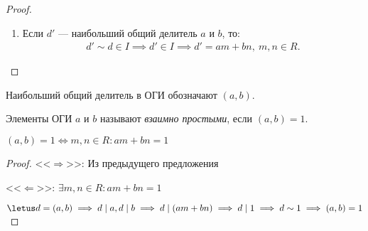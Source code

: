 \begin{proof}
\begin{enumerate}
        \item Если $d'$ --- наибольший общий делитель $a$ и $b$, то:
        \begin{gather*}
            d' \sim d \in I \implies d' \in I \implies d' = am + bn,~m, n \in R.
        \end{gather*}
    \end{enumerate}
\end{proof}

\begin{notice}
    Наибольший общий делитель в ОГИ обозначают $(a, b)$.
\end{notice}

\begin{defn}
    Элементы  ОГИ $a$ и $b$ называют \emph{взаимно простыми}, если $(a, b) = 1$.
\end{defn}

\begin{theorem-non}
    $(a, b) = 1 \iff m, n \in R: am + bn = 1$
\end{theorem-non}

\begin{proof}

    <<$\Rightarrow$>>: Из предыдущего предложения

    <<$\Leftarrow$>>: $\exists m,n \in R: am + bn = 1$ 
    
    $\letus d = (a, b) \implies d \mid a, d \mid b \implies d \mid (am + bn) \implies d \mid 1 \implies d \sim 1 \implies (a, b) = 1$
\end{proof}
